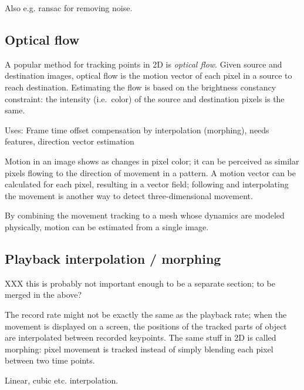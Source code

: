 Also e.g. ransac for removing noise.

 \cite{zhao2005alignment}


\subsection{Optical flow} %

A popular method for tracking points in 2D is \emph{optical flow}.
Given source and destination images, optical flow is the motion vector of each pixel in a source to reach destination.
Estimating the flow is based on the brightness constancy constraint: the intensity (i.e.\ color) of the source and destination pixels is the same.


Uses: Frame time offset compensation by interpolation (morphing), needs features, direction vector estimation

Motion in an image shows as changes in pixel color; it can be perceived as similar pixels flowing to the direction of movement in a pattern.
A motion vector can be calculated for each pixel, resulting in a vector field; following and interpolating the movement is another way to detect three-dimensional movement.
\cite{gibson1950perception,horn1981determining,beauchemin1995computation}

By combining the movement tracking to a mesh whose dynamics are modeled physically, motion can be estimated from a single image.
\cite{decarlo1996integration}


\subsection{Playback interpolation / morphing} %

XXX this is probably not important enough to be a separate section; to be merged in the above?

The record rate might not be exactly the same as the playback rate; when the movement is displayed on a screen, the positions of the tracked parts of object are interpolated between recorded keypoints.
The same stuff in 2D is called morphing: pixel movement is tracked instead of simply blending each pixel between two time points.

Linear, cubic etc. interpolation.

